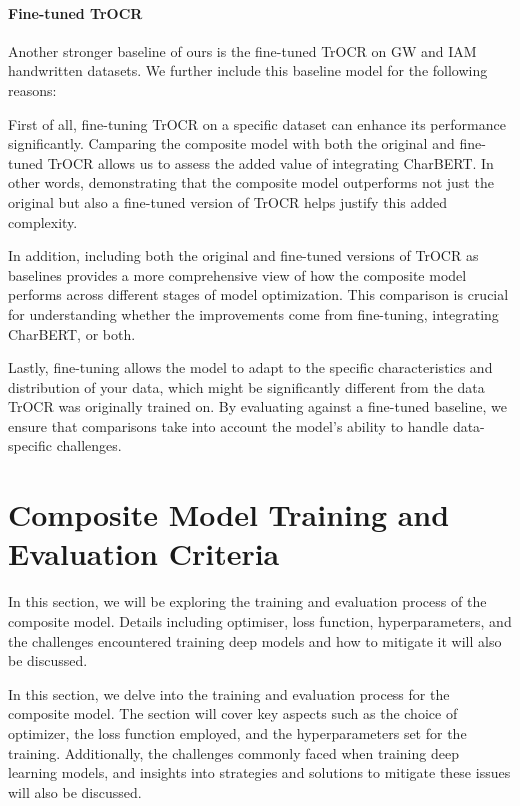 \paragraph*{Fine-tuned TrOCR}
\label{par:4_fine_tuned_trocr}
Another stronger baseline of ours is the fine-tuned TrOCR on GW and IAM handwritten datasets. We further include this baseline model for the following reasons: 

First of all, fine-tuning TrOCR on a specific dataset can enhance its performance significantly. Camparing the composite model with both the original and fine-tuned TrOCR allows us to assess the added value of integrating CharBERT. In other words, demonstrating that the composite model outperforms not just the original but also a fine-tuned version of TrOCR helps justify this added complexity. 

In addition, including both the original and fine-tuned versions of TrOCR as baselines provides a more comprehensive view of how the composite model performs across different stages of model optimization. This comparison is crucial for understanding whether the improvements come from fine-tuning, integrating CharBERT, or both. 

Lastly, fine-tuning allows the model to adapt to the specific characteristics and distribution of your data, which might be significantly different from the data TrOCR was originally trained on. By evaluating against a fine-tuned baseline, we ensure that comparisons take into account the model's ability to handle data-specific challenges.
\section{Composite Model Training and Evaluation Criteria}
\label{sec:3_model_training_and_evaluation_criteria}
In this section, we will be exploring the training and evaluation process of the composite model. Details including optimiser, loss function, hyperparameters, and the challenges encountered training deep models and how to mitigate it will also be discussed.

In this section, we delve into the training and evaluation process for the composite model. The section will cover key aspects such as the choice of optimizer, the loss function employed, and the hyperparameters set for the training. Additionally, the challenges commonly faced when training deep learning models, and insights into strategies and solutions to mitigate these issues will also be discussed.
